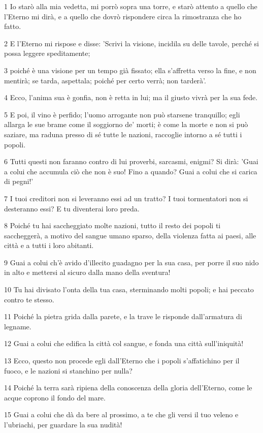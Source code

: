 \par 1 Io starò alla mia vedetta, mi porrò sopra una torre, e starò attento a quello che l'Eterno mi dirà, e a quello che dovrò rispondere circa la rimostranza che ho fatto.
\par 2 E l'Eterno mi rispose e disse: 'Scrivi la visione, incidila su delle tavole, perché si possa leggere speditamente;
\par 3 poiché è una visione per un tempo già fissato; ella s'affretta verso la fine, e non mentirà; se tarda, aspettala; poiché per certo verrà; non tarderà'.
\par 4 Ecco, l'anima sua è gonfia, non è retta in lui; ma il giusto vivrà per la sua fede.
\par 5 E poi, il vino è perfido; l'uomo arrogante non può starsene tranquillo; egli allarga le sue brame come il soggiorno de' morti; è come la morte e non si può saziare, ma raduna presso di sé tutte le nazioni, raccoglie intorno a sé tutti i popoli.
\par 6 Tutti questi non faranno contro di lui proverbi, sarcasmi, enigmi? Si dirà: 'Guai a colui che accumula ciò che non è suo! Fino a quando? Guai a colui che si carica di pegni!'
\par 7 I tuoi creditori non si leveranno essi ad un tratto? I tuoi tormentatori non si desteranno essi? E tu diventerai loro preda.
\par 8 Poiché tu hai saccheggiato molte nazioni, tutto il resto dei popoli ti saccheggerà, a motivo del sangue umano sparso, della violenza fatta ai paesi, alle città e a tutti i loro abitanti.
\par 9 Guai a colui ch'è avido d'illecito guadagno per la sua casa, per porre il suo nido in alto e mettersi al sicuro dalla mano della sventura!
\par 10 Tu hai divisato l'onta della tua casa, sterminando molti popoli; e hai peccato contro te stesso.
\par 11 Poiché la pietra grida dalla parete, e la trave le risponde dall'armatura di legname.
\par 12 Guai a colui che edifica la città col sangue, e fonda una città sull'iniquità!
\par 13 Ecco, questo non procede egli dall'Eterno che i popoli s'affatichino per il fuoco, e le nazioni si stanchino per nulla?
\par 14 Poiché la terra sarà ripiena della conoscenza della gloria dell'Eterno, come le acque coprono il fondo del mare.
\par 15 Guai a colui che dà da bere al prossimo, a te che gli versi il tuo veleno e l'ubriachi, per guardare la sua nudità!

